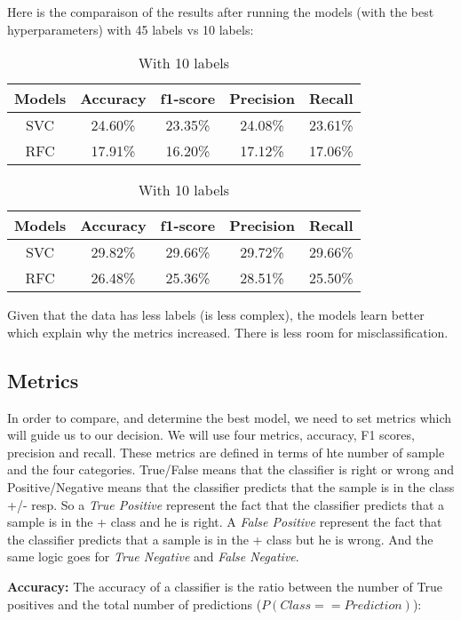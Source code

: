 \documentclass[twocolumn]{article}
\begin{document}
Here is the comparaison of the results after running the models (with the best hyperparameters) with 45 labels vs 10 labels:
\begin{table}[h]
    \centering
    \begin{tabular}{|c|c|c|c|c|}
    \hline
      Models & Accuracy & f1-score & Precision & Recall\\  
      \hline
      SVC & 24.60\% & 23.35\% & 24.08\% & 23.61\% \\
        \hline
      RFC & 17.91\% & 16.20\% & 17.12\% & 17.06\% \\
    \hline
    \end{tabular}
    \label{tab:my_label}
    \caption{With 45 labels}
    
    \centering
    \begin{tabular}{|c|c|c|c|c|}
    \hline
      Models & Accuracy & f1-score & Precision & Recall\\  
      \hline
      SVC & 29.82\% & 29.66\% & 29.72\% & 29.66\%\\
        \hline
      RFC & 26.48\% & 25.36\% & 28.51\% & 25.50\% \\
    \hline
    \end{tabular}
    \label{tab:my_label}
    \caption{With 10 labels}
\end{table}

Given that the data has less labels (is less complex), the models learn better which explain why the metrics increased. There is less room for misclassification.

\subsection{Metrics}
In order to compare, and determine the best model, we need to set metrics which will guide us to our decision. We will use four metrics, accuracy, F1 scores, precision and recall. These metrics are defined in terms of hte number of sample and the four categories. True/False means that the classifier is right or wrong and Positive/Negative means that the classifier predicts that the sample is in the class +/- resp. So a \textit{True Positive} represent the fact that the classifier predicts that a sample is in the + class and he is right. A \textit{False Positive} represent the fact that the classifier predicts that a sample is in the + class but he is wrong. And the same logic goes for \textit{True Negative}  and \textit{False Negative}.

\textbf{Accuracy:} The accuracy of a classifier is the ratio between the number of True positives and the total number of predictions ($P(Class == Prediction)$): 
\end{document}
